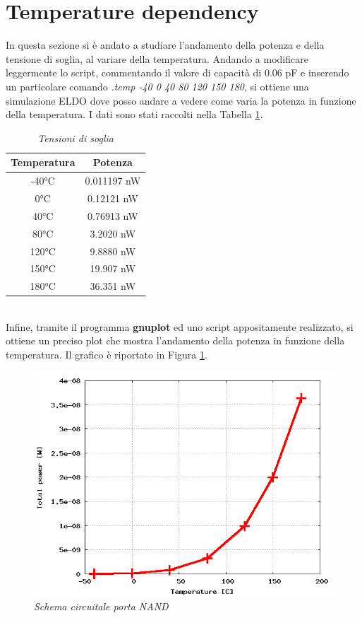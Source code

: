 \section{Temperature dependency}
In questa sezione si è andato a studiare l'andamento della potenza e della tensione di soglia, al variare della temperatura. Andando a modificare leggermente lo script, commentando il valore di capacità di 0.06 pF e inserendo un particolare comando \textit{.temp -40 0 40 80 120 150 180}, si ottiene una simulazione ELDO dove posso andare a vedere come varia la potenza in funzione della temperatura. I dati sono stati raccolti nella Tabella \ref{Tab5_23}.
\begin{table}[!h]\footnotesize
	\centering
	\begin{tabular}{|c|c|}
		\hline
		\textbf{Temperatura}&\textbf{Potenza}\\
		\hline
		-40°C&0.011197 nW\\
		0°C&0.12121 nW\\
		40°C&0.76913 nW\\
		80°C&3.2020 nW\\
		120°C&9.8880 nW\\
		150°C&19.907 nW\\
		180°C&36.351 nW\\
		\hline
	\end{tabular}
	\caption{\textit{Tensioni di soglia}}
	\label{Tab5_23}
\end{table}
\\
Infine, tramite il programma \textbf{gnuplot} ed uno script appositamente realizzato, si ottiene un preciso plot che mostra l'andamento della potenza in funzione della temperatura. Il grafico è riportato in Figura \ref{TEMP}.
\begin{figure}[!htb]
	\centering
	\includegraphics[scale=0.55]{immagini/TEMP}
	\caption{\textit{Schema circuitale porta NAND}}
	\label{TEMP}
\end{figure}
